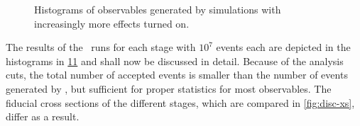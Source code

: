 \begin{figure}[ht]
  \centering
  \begin{subfigure}[t]{.49\textwidth}
    \caption{\label{fig:disc-cos_theta}}
  \end{subfigure}
  \begin{subfigure}[t]{.49\textwidth}
    \caption{\label{fig:disc-eta}}
  \end{subfigure}
  \begin{subfigure}[t]{.49\textwidth}
    \caption{\label{fig:disc-total_pT}}
  \end{subfigure}
  \begin{subfigure}[t]{.49\textwidth}
    \caption{\label{fig:disc-inv_m}}
  \end{subfigure}
  \begin{subfigure}[t]{.49\textwidth}
    \caption{\label{fig:disc-o_angle}}
  \end{subfigure}
\end{figure}
%
\begin{figure}[t]
  \centering \ContinuedFloat
  \begin{subfigure}[t]{.49\textwidth}
    \caption{\label{fig:disc-o_angle_cs}}
  \end{subfigure}
  \begin{subfigure}[t]{.49\textwidth}
    \caption{\label{fig:disc-pT}}
  \end{subfigure}
  \begin{subfigure}[t]{.49\textwidth}
    \caption{\label{fig:disc-pT_subl}}
  \end{subfigure}
  \begin{subfigure}[t]{.49\textwidth}
    \caption{\label{fig:disc-azimuthal_angle}}
  \end{subfigure}

  \caption{\label{fig:holhistos} Histograms of observables generated
    by simulations with increasingly more effects turned on.}
\end{figure}
%
The results of the \sherpa\ runs for each stage with \(10^7\) events
each are depicted in the histograms in \cref{fig:holhistos} and shall
now be discussed in detail.
Because of the analysis cuts, the total number of accepted events is
smaller than the number of events generated by \sherpa, but sufficient
for proper statistics for most observables. The fiducial cross
sections of the different stages, which are compared in
\cref{fig:disc-xs}, differ as a result.

